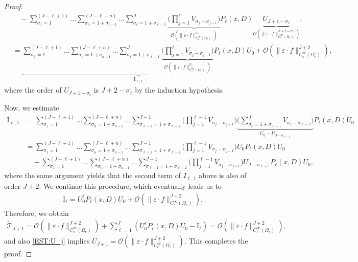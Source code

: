 \documentclass [oneside,11pt] {amsart}
\numberwithin{equation}{section}
\begin{document}
\begin{proof}
\begin{align*}
&\quad - \sum_{\sigma_1 = 1}^{(J-\ell+1)}\ldots \sum_{\sigma_n = 1 + \sigma_{n-1}}^{(J-\ell+n)}\ldots \sum_{\sigma_\ell = 1 + \sigma_{\ell-1}}^{J}  \underbrace{\bigg( \prod_{j=1}^\ell V_{\sigma_j-\sigma_{j-1}} \bigg)}_{ \mathcal{O}(\|\varepsilon\cdot f\|^{\sigma_\ell}_{C_c^\infty(\Omega_e)})}    P_\ell(x,D) \underbrace{U_{J+1-\sigma_\ell}}_{\mathcal{O}(\|\varepsilon\cdot f\|^{J+2-\sigma_\ell}_{C_c^\infty(\Omega_e)})},\\
&= \underbrace{\sum_{\sigma_1 = 1}^{(J-\ell+1)} \ldots \sum_{\sigma_n = 1 + \sigma_{n-1}}^{(J-\ell+n)} \ldots \sum_{\sigma_\ell = 1 + \sigma_{\ell-1}}^{J}  \underbrace{\bigg( \prod_{j=1}^\ell V_{\sigma_j-\sigma_{j-1}} \bigg)}_{ \mathcal{O}(\|\varepsilon\cdot f\|^{\sigma_\ell}_{C_c^\infty(\Omega_e)})}    P_\ell(x,D) U_0 }_{\mathrm{I}_{\ell,1}} +\mathcal{O} (\|\varepsilon\cdot f\|^{J+2}_{C_c^\infty(\Omega_e)}),
\end{align*}	
where the order of $U_{J+1-\sigma_\ell}$ is $J+2-\sigma_\ell$ by the induction hypothesis.


Now, we estimate 
\begin{align*}
\mathrm{I}_{\ell,1} 
&=  \sum_{\sigma_1 = 1}^{(J-\ell+1)}\ldots \sum_{\sigma_n = 1 + \sigma_{n-1}}^{(J-\ell+n)}\ldots \sum_{\sigma_{\ell-1} = 1 + \sigma_{\ell-2}}^{J-1}  \bigg( \prod_{j=1}^{\ell-1} V_{\sigma_j-\sigma_{j-1}} \bigg) \underbrace{\bigg(\sum_{\sigma_\ell= 1 +  \sigma_{\ell-1}}^{J} V_{\sigma_\ell-\sigma_{\ell-1}} \bigg)}_{U_0-U_{J-\sigma_{\ell-1}}}  P_\ell(x,D) U_{0}  \\
&=  \sum_{\sigma_1 = 1}^{(J-\ell+1)}\ldots \sum_{\sigma_n = 1 + \sigma_{n-1}}^{(J-\ell+n)}\ldots \sum_{\sigma_{\ell-1} = 1 + \sigma_{\ell-2}}^{J-1}  \bigg( \prod_{j=1}^{\ell-1} V_{\sigma_j-\sigma_{j-1}} \bigg)  U_0  P_\ell(x,D) U_{0} \\
&\quad - \sum_{\sigma_1 = 1}^{(J-\ell+1)}\ldots \sum_{\sigma_n = 1 + \sigma_{n-1}}^{(J-\ell+n)}\ldots \sum_{\sigma_{\ell-1} = 1 + \sigma_{\ell-2}}^{J-1}  \bigg( \prod_{j=1}^{\ell-1} V_{\sigma_j-\sigma_{j-1}} \bigg)   U_{J-\sigma_{\ell-1}}   P_\ell(x,D) U_{0},
\end{align*}	
where the same argument yields that the second term of $I_{\ell,1}$ above is also of order $J+2$.
We continue this procedure, which eventually leads us to 
\begin{align*}
\mathrm{I}_{\ell} = U_0^\ell P_{\ell}(x,D) U_0 + \mathcal{O}(\|\varepsilon\cdot f\|^{J+2}_{C_c^\infty(\Omega_e)}).
\end{align*}
Therefore, we obtain 
\begin{align*}
\widetilde{\mathcal{T}}_{J+1} = \mathcal{O}(\|\varepsilon\cdot f\|^{J+2}_{C_c^\infty(\Omega_e)})+\sum^{J}_{\ell=1} \left(U_0^ {\ell}P_\ell(x,D)U_0 - \mathrm{I}_{\ell}\right) =  \mathcal{O}(\|\varepsilon\cdot f\|^{J+2}_{C_c^\infty(\Omega_e)}),
\end{align*}
and also \eqref{EST:U_j} implies 
$U_{J+1}=  \mathcal{O}(\|\varepsilon\cdot f\|^{J+2}_{C_c^\infty(\Omega_e)})$. This completes the proof.

\end{proof}
\end{document}
